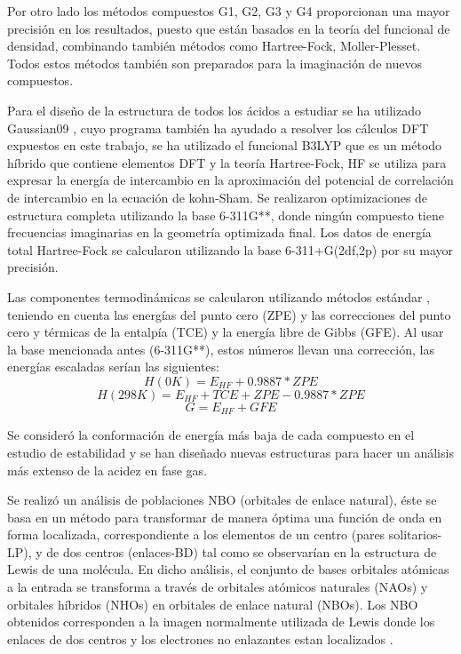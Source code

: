 Por otro lado los métodos compuestos G1, G2, G3 y G4 proporcionan una mayor precisión en los resultados, puesto que están basados en la teoría del funcional de densidad, combinando también métodos como Hartree-Fock, Moller-Plesset.
Todos estos métodos también son preparados para la imaginación de nuevos compuestos.

Para el diseño de la estructura de todos los ácidos a estudiar se ha utilizado Gaussian09 \cite{Gaussian}, cuyo programa también ha ayudado a resolver los cálculos DFT expuestos en este trabajo, se ha utilizado el funcional B3LYP \cite{quimica10} \cite{quimica9} que es un método híbrido que contiene elementos DFT y la teoría Hartree-Fock, HF se utiliza para expresar la energía de intercambio en la aproximación del potencial de correlación de intercambio en la ecuación de kohn-Sham. Se realizaron optimizaciones de estructura completa utilizando la base 6-311G**, donde ningún compuesto tiene frecuencias imaginarias en la geometría optimizada final. Los datos de energía total Hartree-Fock se calcularon utilizando la base 6-311+G(2df,2p) por su mayor precisión.


Las componentes termodinámicas se calcularon utilizando métodos estándar \cite {quimica4}, teniendo en cuenta las energías del punto cero (ZPE) y las correcciones del punto cero y térmicas de la entalpía (TCE) y la energía libre de Gibbs (GFE). Al usar la base mencionada antes (6-311G**), estos números llevan una corrección, las energías escaladas serían las siguientes: \\
$$ H (0K) = E_{HF} + 0.9887*ZPE $$ 
$$ H (298K) = E_{HF} + TCE + ZPE - 0.9887*ZPE $$ 
$$G = E_{HF} + GFE $$

Se consideró la conformación de energía más baja de cada compuesto en el estudio de estabilidad y se han diseñado nuevas estructuras para hacer un análisis más extenso de la acidez en fase gas.

Se realizó un análisis de poblaciones NBO (orbitales de enlace natural), éste se basa en un método para transformar de manera óptima una función de onda en forma localizada, correspondiente a los elementos de un centro (pares solitarios-LP), y de dos centros (enlaces-BD) tal como se observarían en la estructura de Lewis de una molécula. En dicho análisis, el conjunto de bases orbitales atómicas a la entrada se transforma a través de orbitales atómicos naturales (NAOs) y orbitales híbridos (NHOs) en orbitales de enlace natural (NBOs). Los NBO obtenidos corresponden a la imagen normalmente utilizada de Lewis donde los enlaces de dos centros y los electrones no enlazantes estan localizados \cite{quimica5} \cite{quimica8}.


